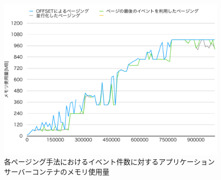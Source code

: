 \documentclass[../../../../../main]{subfiles}
\begin{document}
    \begin{figure}[H]
        \centering
        \includegraphics[width=12cm]{graph}
        \caption{各ページング手法におけるイベント件数に対するアプリケーションサーバーコンテナのメモリ使用量}
        \label{fig:each-paging-app-mem-app_1_1024-db_1_1024}
    \end{figure}
\end{document}
